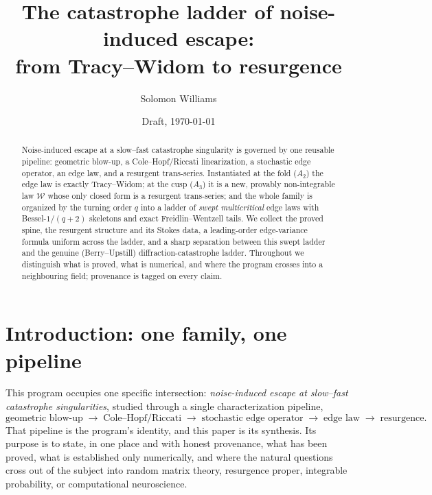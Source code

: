 \documentclass[11pt,reqno]{amsart}
\theoremstyle{plain}
\theoremstyle{definition}
\theoremstyle{remark}
\newcommand{\W}{\mathcal{W}}
\begin{document}
\title[The catastrophe ladder of noise-induced escape]{The catastrophe ladder of
noise-induced escape:\\ from Tracy--Widom to resurgence}
\author{Solomon Williams}
\address{School of Mathematics, University of Edinburgh, Edinburgh EH9 3FD, United Kingdom}
\date{Draft, \today}

\begin{abstract}
Noise-induced escape at a slow--fast catastrophe singularity is governed by one reusable
pipeline: geometric blow-up, a Cole--Hopf/Riccati linearization, a stochastic edge operator,
an edge law, and a resurgent trans-series. Instantiated at the fold ($A_2$) the edge law is
exactly Tracy--Widom; at the cusp ($A_3$) it is a new, provably non-integrable law $\W$ whose
only closed form is a resurgent trans-series; and the whole family is organized by the turning
order $q$ into a ladder of \emph{swept multicritical} edge laws with Bessel-$1/(q{+}2)$
skeletons and exact Freidlin--Wentzell tails. We collect the proved spine, the resurgent
structure and its Stokes data, a leading-order edge-variance formula uniform across the ladder,
and a sharp separation between this swept ladder and the genuine (Berry--Upstill)
diffraction-catastrophe ladder. Throughout we distinguish what is proved, what is numerical,
and where the program crosses into a neighbouring field; provenance is tagged on every claim.
\end{abstract}

\maketitle

\section{Introduction: one family, one pipeline}\label{sec:intro}

This program occupies one specific intersection: \emph{noise-induced escape at slow--fast
catastrophe singularities}, studied through a single characterization pipeline,
\[
\text{geometric blow-up} \;\to\; \text{Cole--Hopf/Riccati} \;\to\;
\text{stochastic edge operator} \;\to\; \text{edge law} \;\to\; \text{resurgence}.
\]
That pipeline is the program's identity, and this paper is its synthesis. Its purpose is to
state, in one place and with honest provenance, what has been proved, what is established only
numerically, and where the natural questions cross out of the subject into random matrix theory,
resurgence proper, integrable probability, or computational neuroscience.
\end{document}
